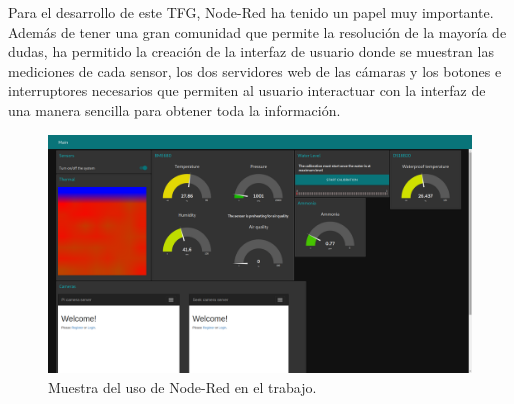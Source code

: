 Para el desarrollo de este TFG, Node-Red ha tenido un papel muy importante. Además de tener una gran comunidad que permite la resolución de la mayoría de dudas, ha permitido la creación de la interfaz de usuario donde se muestran las mediciones de cada sensor, los dos servidores web de las cámaras y los botones e interruptores necesarios que permiten al usuario interactuar con la interfaz de una manera sencilla para obtener toda la información.\\
\begin{figure} [h!]
  \begin{center}
    \includegraphics[width=15cm]{figs/interfaz}
  \end{center}
  \caption{Muestra del uso de Node-Red en el trabajo.}
  \label{fig:node-imagenes}
\end{figure}

